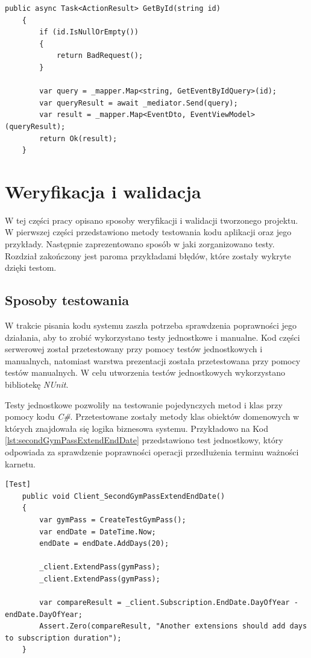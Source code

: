 \documentclass[a4paper,twoside,12pt]{book}
\begin{document}
\begin{lstlisting}[caption={Metoda \textit{GetById} klasy \textit{EventController}}, label={lst:mediator}]
	public async Task<ActionResult> GetById(string id)
	{
		if (id.IsNullOrEmpty())
		{
			return BadRequest();
		}
		
		var query = _mapper.Map<string, GetEventByIdQuery>(id);
		var queryResult = await _mediator.Send(query);
		var result = _mapper.Map<EventDto, EventViewModel>(queryResult);
		return Ok(result);
	}
\end{lstlisting}

\chapter{Weryfikacja i walidacja}
W tej części pracy opisano sposoby weryfikacji i walidacji tworzonego projektu. W pierwszej części przedstawiono metody testowania kodu aplikacji oraz jego przykłady. Następnie zaprezentowano sposób w jaki zorganizowano testy. Rozdział zakończony jest paroma przykładami błędów, które zostały wykryte dzięki testom.

\section{Sposoby testowania}
W trakcie pisania kodu systemu zaszła potrzeba sprawdzenia poprawności jego działania, aby to zrobić wykorzystano testy jednostkowe i manualne. Kod części serwerowej został przetestowany przy pomocy testów jednostkowych i manualnych, natomiast warstwa prezentacji została przetestowana przy pomocy testów manualnych. W celu utworzenia testów jednostkowych wykorzystano bibliotekę \textit{NUnit}.

Testy jednostkowe pozwoliły na testowanie pojedynczych metod i klas przy pomocy kodu \textit{C\#}. Przetestowane zostały metody klas obiektów domenowych w których znajdowała się logika biznesowa systemu. Przykładowo na Kod \ref{lst:secondGymPassExtendEndDate} przedstawiono test jednostkowy, który odpowiada za sprawdzenie poprawności operacji przedłużenia terminu ważności karnetu.
\begin{lstlisting}[caption={Przykładowy test klasy \textit{ClientUnitTest}}, label={lst:secondGymPassExtendEndDate}]
	[Test]
	public void Client_SecondGymPassExtendEndDate()
	{
		var gymPass = CreateTestGymPass();
		var endDate = DateTime.Now;
		endDate = endDate.AddDays(20);
		
		_client.ExtendPass(gymPass);
		_client.ExtendPass(gymPass);
		
		var compareResult = _client.Subscription.EndDate.DayOfYear - endDate.DayOfYear;
		Assert.Zero(compareResult, "Another extensions should add days to subscription duration");
	}
\end{lstlisting}
\end{document}
